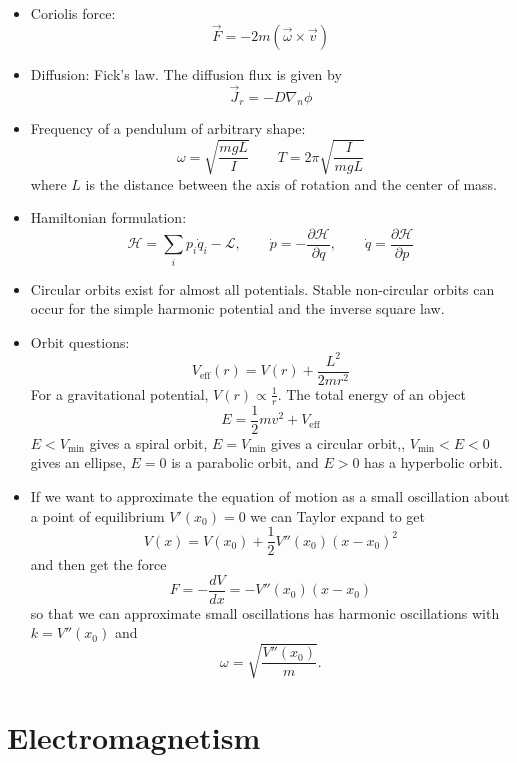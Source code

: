 \documentclass[12pt,a4paper]{book}
\begin{document}
\begin{itemize}
\begin{itemize}
\end{itemize}
\item Coriolis force:\[
\vec{F}=-2m(\vec{\omega}\times\vec{v})\]

\item Diffusion: Fick's law. The diffusion flux is given by\[
\vec{J}_{r}=-D\nabla_{n}\phi\]

\item Frequency of a pendulum of arbitrary shape:\[
\omega=\sqrt{\frac{mgL}{I}}\qquad T=2\pi\sqrt{\frac{I}{mgL}}\]
where $L$ is the distance between the axis of rotation and the center
of mass.
\item Hamiltonian formulation:\[
\mathcal{H}=\sum_{i}p_{i}\dot{q}_{i}-\mathcal{L},\qquad\dot{p}=-\frac{\partial\mathcal{H}}{\partial q},\qquad\dot{q}=\frac{\partial\mathcal{H}}{\partial p}\]

\item Circular orbits exist for almost all potentials. Stable non-circular
orbits can occur for the simple harmonic potential and the inverse
square law.
\item Orbit questions:\[
V_{\text{eff}}(r)=V(r)+\frac{L^{2}}{2mr^{2}}\]
For a gravitational potential, $V(r)\propto\frac{1}{r}$. The total
energy of an object\[
E=\frac{1}{2}mv^{2}+V_{\text{eff}}\]
$E<V_{\text{min}}$ gives a spiral orbit, $E=V_{\text{min}}$ gives
a circular orbit,, $V_{\text{min}}<E<0$ gives an ellipse, $E=0$
is a parabolic orbit, and $E>0$ has a hyperbolic orbit.
\item If we want to approximate the equation of motion as a small oscillation
about a point of equilibrium $V'(x_{0})=0$ we can Taylor expand to
get\[
V(x)=V(x_{0})+\frac{1}{2}V''(x_{0})(x-x_{0})^{2}\]
and then get the force \[
F=-\frac{dV}{dx}=-V''(x_{0})(x-x_{0})\]
so that we can approximate small oscillations has harmonic oscillations
with $k=V''(x_{0})$ and\[
\omega=\sqrt{\frac{V''(x_{0})}{m}}.\]

\end{itemize}



















\chapter{Electromagnetism}
\end{document}
